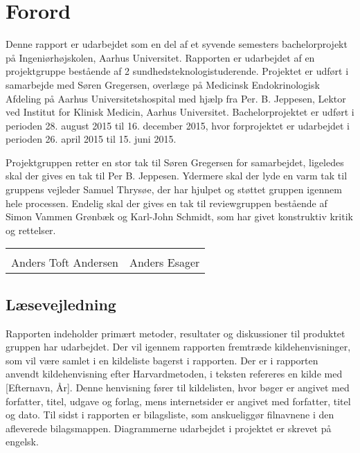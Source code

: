 \chapter*{Forord}

Denne rapport er udarbejdet som en del af et syvende semesters bachelorprojekt på Ingeniørhøjskolen, Aarhus Universitet. Rapporten er udarbejdet af en projektgruppe bestående af 2 sundhedsteknologistuderende. Projektet er udført i samarbejde med Søren Gregersen, overlæge på Medicinsk Endokrinologisk Afdeling på Aarhus Universitetshospital med hjælp fra Per. B. Jeppesen, Lektor ved Institut for Klinisk Medicin, Aarhus Universitet. Bachelorprojektet er udført i perioden 28. august 2015 til 16. december 2015, hvor forprojektet er udarbejdet i perioden 26. april 2015 til 15. juni 2015.  

Projektgruppen retter en stor tak til Søren Gregersen for samarbejdet, ligeledes skal der gives en tak til Per B. Jeppesen. Ydermere skal der lyde en varm tak til gruppens vejleder Samuel Thrysøe, der har hjulpet og støttet gruppen igennem hele processen. Endelig skal der gives en tak til reviewgruppen bestående af Simon Vammen Grønbæk og Karl-John Schmidt, som har givet konstruktiv kritik og rettelser. 






\phantom{Luft}

\phantom{Luft}

\begin{table}[H]
	\centering
		\begin{tabular}{c c}
			\underline{\phantom{mmmmmmmmmmmmmm}} & \underline{\phantom{mmmmmmmmmmmmmm}}  \\
			Anders Toft Andersen			& Anders Esager		 			\\ 										\end{tabular}
\end{table}

\section*{Læsevejledning}
Rapporten indeholder primært metoder, resultater og diskussioner til produktet gruppen har udarbejdet. Der vil igennem rapporten fremtræde kildehenvisninger, som vil være samlet i en kildeliste bagerst i rapporten. Der er i rapporten anvendt kildehenvisning efter Harvardmetoden, i teksten refereres en kilde med [Efternavn, År]. Denne henvisning fører til kildelisten, hvor bøger er angivet med forfatter, titel, udgave og forlag, mens internetsider er angivet med forfatter, titel og dato. Til sidst i rapporten er bilagsliste, som anskueliggør filnavnene i den afleverede bilagsmappen. Diagrammerne udarbejdet i projektet er skrevet på engelsk. 

